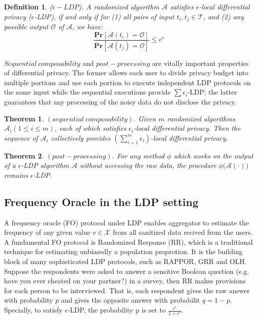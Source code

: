 \documentclass[conference]{IEEEtran}
\begin{document}
\newtheorem{Definition}{\bf Definition}
\begin{Definition}
($\epsilon-LDP$). A randomized algorithm $\mathcal{A}$ satisfies $\epsilon$-local differential privacy ($\epsilon$-LDP), if and only if for (1) all pairs of input $t_i,t_j \in \mathcal{T}$, and (2) any possible output $\mathcal{O}$ of $\mathcal{A}$, we have:\\
$$\frac{\mathbf{Pr}[\mathcal{A}(t_i)=\mathcal{O}]}{\mathbf{Pr}[\mathcal{A}(t_j)=\mathcal{O}]} \leq e^{\epsilon}$$
\end{Definition}

$Sequential\  composability$\cite{a9} and $post-processing$\cite{post-processing} are vitally important properties of differential privacy. The former allows each user to divide privacy budget into multiple portions and use each portion to execute independent LDP protocols on the same input while the sequential executions provide $\sum \epsilon_i$-LDP; the latter guarantees that any processing of the noisy data do not disclose the privacy.

\newtheorem{theorem}{\bf Theorem}[section]
\begin{theorem}\label{sequential composability}
$(sequential\ composability)$. Given $m$ randomized algorithms $\mathcal{A}_i(1 \leq i \leq m)$, each of which satisfies $\epsilon_i$-local differential privacy. Then the sequence of $\mathcal{A}_i$ collectively provides $(\sum_{i=1}^{m} \epsilon_i)$-local differential privacy. 
\end{theorem}

\begin{theorem}\label{post processing}
$(post-processing)$. For any method $\phi$ which works on the output of a $\epsilon$-LDP algorithm $\mathcal{A}$ without accessing the raw data, the procedure $\phi \big(\mathcal{A(\cdot)} \big)$ remains $\epsilon$-LDP.
\end{theorem}

\subsection{Frequency Oracle in the LDP setting}
A frequency oracle (FO) protocol under LDP enables aggregator to estimate the frequency of any given value $v \in \mathcal{X}$ from all sanitized data recived from the users. A fundamental FO protocol is Randomized Response (RR)\cite{rr}, which is a traditional technique for estimating unbiasedly a population proprotion. It is the building block of many sophisticated LDP protocols, such as RAPPOR\cite{rappor}, GRR and OLH\cite{a8}. Suppose the respondents were asked to answer a sensitive Boolean question (e.g. have you ever cheated on your partner?) in a survey, then RR makes provisions for each person to be interviewed. That is, each respondent gives the raw answer with probability $p$ and gives the opposite answer with probabilit $q = 1-p$. Specially, to satisfy $\epsilon$-LDP, the probability p is set to $\frac{e^{\epsilon}}{1+e^{\epsilon}}$. 
\end{document}
